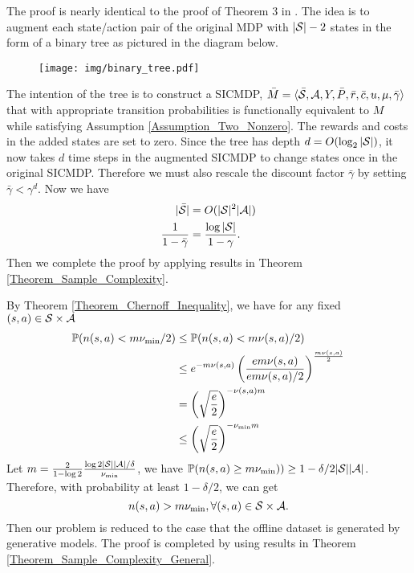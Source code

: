 The proof is nearly identical to the proof of Theorem 3 in \cite{LATTIMORE2014125}. The idea is to augment each state/action pair of the original MDP with $|{\mathcal{S}}|-2$ states in the form of a binary tree as pictured in the diagram below. 

\begin{figure}[!htb]
    \centering
    \texttt{[image: img/binary\_tree.pdf]}
    \label{Figure_Binary_Tree}
\end{figure}

The intention of the tree is to construct a SICMDP, $\bar M=\langle \bar {{\mathcal{S}}},{\mathcal{A}},Y,\bar P,\bar r,\bar c,u,\mu,\bar\gamma\rangle$ that with appropriate transition probabilities is functionally equivalent to $M$ while satisfying Assumption \ref{Assumption_Two_Nonzero}.
The rewards and costs in the added states are set to zero.
Since the tree has depth $d=O(\log_2|{\mathcal{S}}|)$, it now takes $d$ time steps in the augmented SICMDP to change states once in the original SICMDP.
Therefore we must also rescale the discount factor $\bar \gamma$ by setting $\bar\gamma<\gamma^d$.
Now we have
$$
\begin{aligned}
|\bar {{\mathcal{S}}}|&= O(|{\mathcal{S}}|^2|{\mathcal{A}}|)\\
\frac{1}{1-\bar \gamma}&=\frac{\log |{\mathcal{S}}|}{1-\gamma}.
\end{aligned}
$$
Then we complete the proof by applying results in Theorem \ref{Theorem_Sample_Complexity}.
\endproof

By Theorem \ref{Theorem_Chernoff_Inequality}, we have for any fixed $(s,a)\in {\mathcal{S}}\times {\mathcal{A}}$
$$
\begin{aligned}
{\mathbb P}(n(s,a)<m\nu_{\min}/2)&\leq {\mathbb P}(n(s,a)<m\nu(s,a)/2)\\
&\leq e^{-m\nu(s,a)}\left(\frac{em\nu(s,a)}{em\nu(s,a)/2}\right)^{\frac{m\nu(s,a)}{2}}\\
&=\left(\sqrt{\frac{e}{2}}\right)^{-\nu(s,a)m}\\
&\leq \left(\sqrt{\frac{e}{2}}\right)^{-\nu_{\min}m}
\end{aligned}
$$
\endproof
Let $m=\frac{2}{1-\log 2}\frac{\log 2|{\mathcal{S}}||{\mathcal{A}}|/\delta}{\nu_{\min}}$, we have ${\mathbb P}(n(s,a)\geq m\nu_{\min}))\geq 1-\delta/2|{\mathcal{S}}||{\mathcal{A}}|$.
Therefore, with probability at least $1-\delta/2$, we can get
$$
n(s,a)>m\nu_{\min}, \forall (s,a)\in {\mathcal{S}}\times {\mathcal{A}}.
$$
Then our problem is reduced to the case that the offline dataset is generated by generative models.
The proof is completed by using results in Theorem \ref{Theorem_Sample_Complexity_General}.
